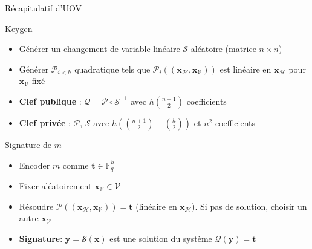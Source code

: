 \begin{frame}{Récapitulatif d'UOV}
    \pause
    \begin{block}{Keygen}
        \begin{itemize}
            \item Générer un changement de variable linéaire $\mathcal{S}$ aléatoire (matrice $n\times n$)
            \pause
            \item Générer $\mathcal{P}_{i<h}$ quadratique tels que $\mathcal{P}_i((\mathbf{x}_\mathcal{H},\mathbf{x}_\mathcal{V}))$ est linéaire en $\mathbf{x}_\mathcal{H}$ pour $\mathbf{x}_\mathcal{V}$ fixé
            \pause
            \item \textbf{Clef publique} : $\mathcal{Q} = \mathcal{P}\circ \mathcal{S}^{-1}$ avec  $h{{n+1}\choose{2}}$ coefficients 
            \pause
            \item \textbf{Clef privée} : $\mathcal{P}$, $\mathcal{S}$ avec $h\left({{n+1}\choose{2}}-{{h}\choose{2}}\right)$ et $n^2$ coefficients 
        \end{itemize}
    \end{block}

    \pause
    \begin{block}{Signature de $m$}
        \begin{itemize}
            \pause
            \item Encoder $m$ comme $\mathbf{t}\in\mathbb{F}_q^h$
            \pause
            \item Fixer aléatoirement $\mathbf{x}_\mathcal{V}\in\mathcal{V}$
            \pause
            \item Résoudre $\mathcal{P}((\mathbf{x}_\mathcal{H},\mathbf{x}_\mathcal{V}))=\mathbf{t}$ (linéaire en $\mathbf{x}_\mathcal{H}$). Si pas de solution, choisir un autre $\mathbf{x}_\mathcal{V}$
            \pause
            \item \textbf{Signature}: $\mathbf{y} = \mathcal{S}(\mathbf{x})$ est une solution du système $\mathcal{Q}(\mathbf{y}) =\mathbf{t}$
        \end{itemize}
    \end{block}
\end{frame}

